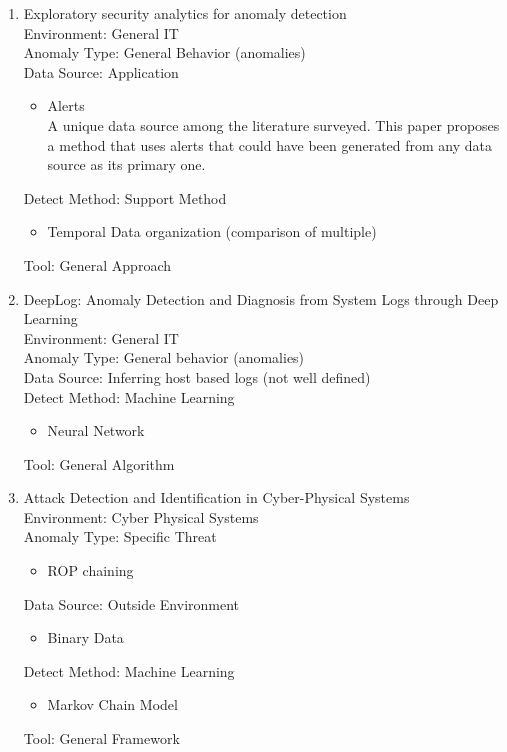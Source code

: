 \begin{enumerate}
    \item
    Exploratory security analytics for anomaly detection\cite{pierazzi2016exploratory}\\
    Environment: General IT\\
    Anomaly Type: General Behavior (anomalies)\\
    Data Source: Application
    \begin{itemize}
        \item Alerts\\
        A unique data source among the literature surveyed. This paper proposes a method that uses alerts that could have been generated from any data source as its primary one.
    \end{itemize}
    Detect Method: Support Method
    \begin{itemize}
        \item Temporal Data organization (comparison of multiple)
    \end{itemize}
    Tool: General Approach
    
    \item
    DeepLog: Anomaly Detection and Diagnosis from System Logs through Deep Learning\cite{du2017deeplog}\\
    Environment: General IT\\
    Anomaly Type: General behavior (anomalies)\\
    Data Source: Inferring host based logs (not well defined) \\
    Detect Method: Machine Learning 
    \begin{itemize}
        \item Neural Network
    \end{itemize}
    Tool: General Algorithm
    
    \item
    Attack Detection and Identification in Cyber-Physical Systems\cite{pasqualetti2013attack}\\
    Environment: Cyber Physical Systems\\
    Anomaly Type: Specific Threat
    \begin{itemize}
        \item ROP chaining
    \end{itemize}
    Data Source: Outside Environment
    \begin{itemize}
        \item Binary Data
    \end{itemize}
    Detect Method: Machine Learning
    \begin{itemize}
        \item Markov Chain Model
    \end{itemize}
    Tool: General Framework
    

\end{enumerate}
